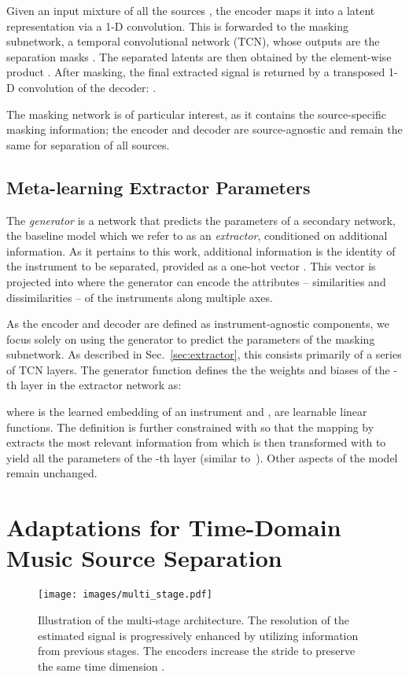 \documentclass{article}
\begin{document}
Given an input mixture  of all the sources , the encoder maps it into a latent representation  via a 1-D convolution. 
This is forwarded to the masking subnetwork, a temporal convolutional network (TCN), whose outputs are the separation masks . The separated latents  are then obtained by the element-wise product . After masking, the final extracted signal  is returned by a transposed 1-D convolution of the decoder: . 


The masking network is of particular interest, as it contains the source-specific masking information; the encoder and decoder are source-agnostic and remain the same for separation of all sources.

\subsection{Meta-learning Extractor Parameters}

The \emph{generator} is a network that predicts the parameters of a secondary network, the baseline model which we refer to as an \emph{extractor}, conditioned on additional information.  As it pertains to this work, additional information is the identity of the instrument to be separated, provided as a one-hot vector .  This vector is projected into  where the generator can encode the attributes -- similarities and dissimilarities -- of the instruments along multiple axes.  


As the encoder and decoder are defined as instrument-agnostic components, we focus solely on using the generator to predict the parameters of the masking subnetwork.  As described in Sec.~\ref{sec:extractor}, this
 consists primarily of a series of TCN layers.  The generator function defines the the weights and biases of the -th layer in the extractor network as:


\noindent where  is the learned embedding of an instrument  and ,  are learnable linear functions. The definition is further constrained with  so that the mapping by  extracts the most relevant information from  which is then transformed with  to yield all the parameters of the -th layer (similar to~\cite{platanios-etal-2018-contextual}).  Other aspects of the model remain unchanged.
 \section{Adaptations for Time-Domain Music Source Separation}
\label{subsec:improvements}

\begin{figure}
\centering
\hspace{-1em}
\texttt{[image: images/multi\_stage.pdf]}
\caption{Illustration of the multi-stage architecture. The resolution of the estimated signal is progressively enhanced by utilizing information from previous stages. The encoders increase the stride  to preserve the same time dimension .}
\label{fig:multi_stage}
\end{figure}
\end{document}
